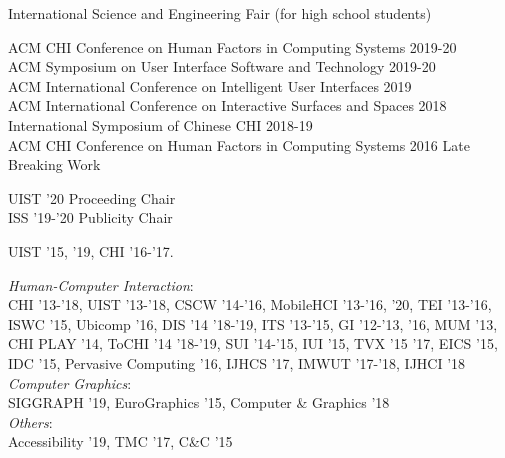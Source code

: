 

 {
	 {
			International Science and Engineering Fair (for high school students)
		}
}

 {
}

 {
	 {
		ACM CHI Conference on Human Factors in Computing Systems 2019-20\\
		ACM Symposium on User Interface Software and Technology 2019-20\\
		ACM International Conference on Intelligent User Interfaces 2019\\
		ACM International Conference on Interactive Surfaces and Spaces 2018\\
		International Symposium of Chinese CHI 2018-19\\
		ACM CHI Conference on Human Factors in Computing Systems 2016 Late Breaking Work
	}
}

 {
	 {
		UIST '20 Proceeding Chair\\
		ISS '19-'20 Publicity Chair\\
	}
}

 {
	 {
		UIST '15, '19, CHI '16-'17.
	}
}

 {
	 {
	\textit{Human-Computer Interaction}:\\
		CHI '13-'18, UIST '13-'18, CSCW '14-'16, MobileHCI '13-'16, '20, TEI '13-'16, ISWC '15, Ubicomp '16, DIS '14 '18-'19, ITS '13-'15, GI '12-'13, '16, MUM '13, CHI PLAY '14, ToCHI '14 '18-'19, SUI '14-'15, IUI '15, TVX '15 '17, EICS '15, IDC '15, Pervasive Computing '16, IJHCS '17, IMWUT '17-'18, IJHCI '18 \vspace{0.5em}\\
		\textit{Computer Graphics}:\\
		SIGGRAPH '19,  EuroGraphics '15, Computer \& Graphics '18 \vspace{0.5em}\\
		\textit{Others}:\\
		Accessibility '19, TMC '17, C\&C '15
	}
}

